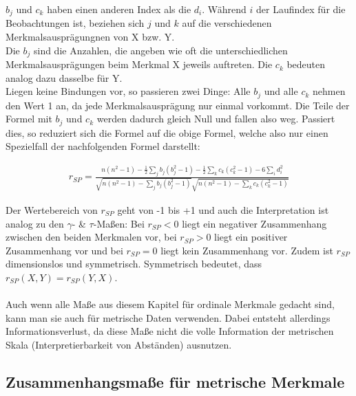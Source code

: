 \documentclass[a4paper]{article}
\newcommand\dangersign{%
 \makebox[1.8em][c]{%
 \makebox[0pt][c]{\raisebox{.15em}{\small!}}%
 \makebox[0pt][c]{\color{red}\Large$\triangle$}}}%
\begin{document}
\noindent \dangersign $b_j$ und $c_k$ haben einen anderen Index als die $d_i$. Während $i$ der Laufindex für die Beobachtungen ist, beziehen sich $j$ und $k$ auf die verschiedenen Merkmalsausprägungnen von X bzw. Y.\\

\noindent Die $b_j$ sind die Anzahlen, die angeben wie oft die unterschiedlichen Merkmalsausprägungen beim Merkmal X jeweils auftreten. Die $c_k$ bedeuten analog dazu dasselbe für Y.\\
Liegen keine Bindungen vor, so passieren zwei Dinge: Alle $b_j$ und alle $c_k$ nehmen den Wert 1 an, da jede Merkmalsausprägung nur einmal vorkommt. Die Teile der Formel mit $b_j$ und $c_k$ werden dadurch gleich Null und fallen also weg. Passiert dies, so reduziert sich die Formel auf die obige Formel, welche also nur einen Spezielfall der nachfolgenden Formel darstellt:

\begin{align*}
    r_{SP}=\frac{n(n^2-1)-\frac{1}{2}\sum_jb_j(b_j^2-1)-\frac{1}{2}\sum_kc_k(c_k^2-1)-6\sum_id_i^2}{\sqrt{n(n^2-1)-\sum_jb_j(b_j^2-1)}\sqrt{n(n^2-1)-\sum_kc_k(c_k^2-1)}}
\end{align*}

\noindent Der Wertebereich von $r_{SP}$ geht von -1 bis +1 und auch die Interpretation ist analog zu den $\gamma$- \& $\tau$-Maßen: Bei $r_{SP}<0$ liegt ein negativer Zusammenhang zwischen den beiden Merkmalen vor, bei $r_{SP}>0$ liegt ein positiver Zusammenhang vor und bei $r_{SP}=0$ liegt kein Zusammenhang vor. Zudem ist $r_{SP}$ dimensionslos und symmetrisch. Symmetrisch bedeutet, dass $r_{SP}(X,Y) = r_{SP}(Y,X)$.\\

\noindent {}\\

\noindent \dangersign Auch wenn alle Maße aus diesem Kapitel für ordinale Merkmale gedacht sind, kann man sie auch für metrische Daten verwenden. Dabei entsteht allerdings Informationsverlust, da diese Maße nicht die volle Information der metrischen Skala (Interpretierbarkeit von Abständen) ausnutzen.

\clearpage

\subsection{Zusammenhangsmaße für metrische Merkmale}\label{sec:zshg-metr}
\end{document}
